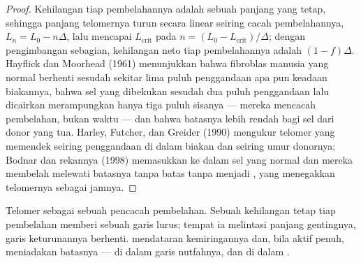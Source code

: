 \begin{proof}
Kehilangan tiap pembelahannya adalah sebuah panjang yang tetap, sehingga panjang telomernya turun
secara linear seiring cacah pembelahannya, $L_{n} = L_{0} - n\Delta$, lalu mencapai
$L_{\text{crit}}$ pada $n = (L_{0} - L_{\text{crit}})/\Delta$; dengan
pengimbangan sebagian, kehilangan neto tiap pembelahannya adalah $(1 - f)\Delta$.
Hayflick dan Moorhead (1961) menunjukkan bahwa fibroblas manusia yang normal berhenti
sesudah sekitar lima puluh penggandaan apa pun keadaan biakannya, bahwa
sel yang dibekukan sesudah dua puluh penggandaan lalu dicairkan merampungkan hanya
tiga puluh sisanya --- mereka mencacah pembelahan, bukan waktu --- dan bahwa
batasnya lebih rendah bagi sel dari donor yang tua. Harley, Futcher, dan Greider
(1990) mengukur telomer yang memendek seiring penggandaan di dalam biakan dan seiring
umur donornya; Bodnar dan rekannya (1998) memasukkan  ke dalam sel
yang normal dan mereka membelah melewati batasnya tanpa batas tanpa menjadi
, yang menegakkan telomernya sebagai jamnya.
\end{proof}

\begin{omfigure}

{\small Telomer sebagai sebuah pencacah pembelahan. Sebuah kehilangan tetap tiap pembelahan memberi
sebuah garis lurus; tempat ia melintasi panjang gentingnya, garis keturunannya berhenti.
 mendataran kemiringannya dan, bila aktif penuh, meniadakan batasnya ---
di dalam garis nutfahnya, dan di dalam .}
\end{omfigure}

